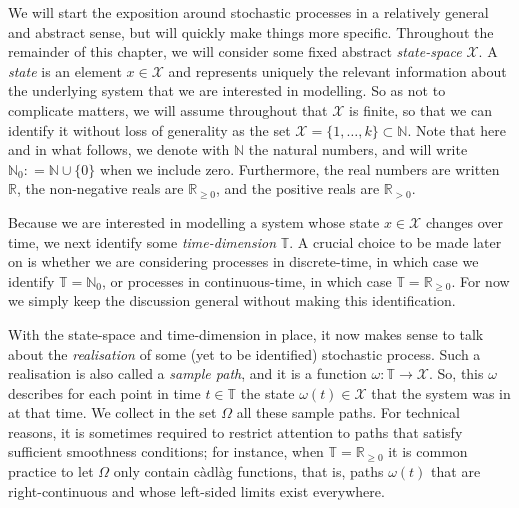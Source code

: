 \documentclass[graybox]{svmult}
\newcommand{\nats}{\mathbb{N}}
\newcommand{\natswith}{\nats_{0}}
\newcommand{\reals}{\mathbb{R}}
\newcommand{\realspos}{\reals_{>0}}
\newcommand{\realsnonneg}{\reals_{\geq 0}}
\newcommand{\states}{\mathcal{X}}
\newcommand{\coloneqq}{:\!=}
\newcommand{\timedim}{\mathbb{T}}
\begin{document}
We will start the exposition around stochastic processes in a relatively general and abstract sense, but will quickly make things more specific. Throughout the remainder of this chapter, we will consider some fixed abstract \emph{state-space} $\states$. A \emph{state} is an element $x\in\states$ and represents uniquely the relevant information about the underlying system that we are interested in modelling. So as not to complicate matters, we will assume throughout that $\states$ is finite, so that we can identify it without loss of generality as the set $\states=\{1,\ldots,k\}\subset\nats$. Note that here and in what follows, we denote with $\nats$ the natural numbers, and will write $\natswith\coloneqq\nats\cup\{0\}$ when we include zero. Furthermore, the real numbers are written $\reals$, the non-negative reals are $\realsnonneg$, and the positive reals are $\realspos$.

Because we are interested in modelling a system whose state $x\in\states$ changes over time, we next identify some \emph{time-dimension} $\timedim$. A crucial choice to be made later on is whether we are considering processes in discrete-time, in which case we identify $\timedim=\natswith$, or processes in continuous-time, in which case $\timedim=\realsnonneg$. For now we simply keep the discussion general without making this identification.

With the state-space and time-dimension in place, it now makes sense to talk about the \emph{realisation} of some (yet to be identified) stochastic process. Such a realisation is also called a \emph{sample path}, and it is a function $\omega:\timedim\to\states$. So, this $\omega$ describes for each point in time $t\in\timedim$ the state $\omega(t)\in\states$ that the system was in at that time. We collect in the set $\Omega$ all these sample paths. For technical reasons, it is sometimes required to restrict attention to paths that satisfy sufficient smoothness conditions; for instance, when $\timedim=\realsnonneg$ it is common practice to let $\Omega$ only contain c\`adl\`ag functions, that is, paths $\omega(t)$ that are right-continuous and whose left-sided limits exist everywhere.
\end{document}
